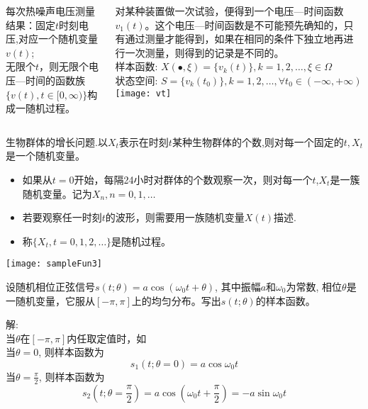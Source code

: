\begin{frame}
\begin{columns}
\begin{example}
每次热噪声电压测量结果：固定$t$时刻电压,对应一个随机变量$v(t)$; \\
无限个$t$，则无限个电压---时间的函数族$\{v(t),t\in[0,\infty)\}$构成一随机过程。\\
\end{example}
对某种装置做一次试验，便得到一个电压---时间函数$v_1(t)$。这个电压---时间函数是不可能预先确知的，只有通过测量才能得到，如果在相同的条件下独立地再进行一次测量，则得到的记录是不同的。\\

\medskip
样本函数: $X(\bullet,\xi)=\{v_k(t)\}, k=1,2,\dots, \xi\in \Omega$\\
状态空间: $S=\{v_k(t_0)\}, k=1,2,\dots, \forall t_0\in (-\infty, +\infty)$
\texttt{[image: vt]}
\end{columns}
\end{frame}

\begin{frame}
\begin{example}
生物群体的增长问题.以$X_t$表示在时刻$t$某种生物群体的个数,则对每一个固定的$t,X_t$是一个随机变量。　
\begin{itemize}
\item 如果从$t=0$开始，每隔24小时对群体的个数观察一次，则对每一个$t$,$X_t$是一簇随机变量。记为$X_n,n=0,1,\dots$
\item 若要观察任一时刻$t$的波形，则需要用一族随机变量$X(t)$描述. 
\item 称$\{X_t,t=0,1,2,\dots\}$是随机过程。
\end{itemize}	
\end{example}
\texttt{[image: sampleFun3]}	
\end{frame}

\begin{frame}
\begin{example}
	设随机相位正弦信号$s(t; \theta)=a\cos(\omega_0 t+\theta)$, 其中振幅$a$和$\omega_0$为常数, 相位$\theta$是一随机变量，它服从$[-\pi,\pi]$上的均匀分布。写出$s(t;\theta)$的样本函数。
\end{example}
解: \\
当$\theta$在$[-\pi,\pi]$内任取定值时，如\\
当$\theta=0$, 则样本函数为
$$s_1(t; \theta=0)=a\cos\omega_0t$$
当$\theta=\frac{\pi}{2}$, 则样本函数为
$$s_2(t; \theta=\frac{\pi}{2})=a\cos(\omega_0t+\frac{\pi}{2})=-a\sin\omega_0t$$
\end{frame}

